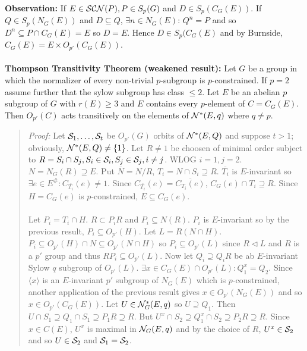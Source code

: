 {\bf Observation:}  If $E \in {\cal SCN}(P), P \in S_p(G)$ and $D \in S_p(C_G(E))$.  If
$Q \in S_p(N_G(E))$ and $D \subseteq Q$, $\exists n \in N_G(E)$: $Q^n=P$ and so
$D^n \subseteq P \cap C_G(E) = E$ so $D=E$.  Hence $D \in S_p(C_G(E)$ and by Burnside,
$C_G(E)= E \times O_{p'}(C_G(E))$.
\\
\\
{\bf Thompson Transitivity Theorem (weakened result):}  Let $G$ be a group in which the
normalizer of every non-trivial $p$-subgroup is $p$-constrained.  If $p=2$ assume further
that the sylow subgroup has class $\le 2$.  Let $E$ be an abelian $p$ subgroup of $G$ with
$r(E) \ge 3$ and $E$ contains every $p$-element of $C= C_G(E)$.  Then
$O_{p'}(C)$ acts transitively on the elements of ${\cal N}^*(E, q)$ where $q \ne p$.
\begin{quote}
\emph{Proof:}  
Let $ {\cal S}_1, \ldots , {\cal S}_t$ be $O_{p'}(G)$ orbits of 
${\cal N}^*(E,Q)$ and suppose $t > 1$; obviously, ${\cal N}^*(E,Q) \ne \{ 1 \}$.
Let $R \ne 1$ be choosen of minimal order subject to  
$R= S_i \cap S_j, S_i \in {\cal S}_i, S_j \in {\cal S}_j, i \ne j$.  WLOG $i=1, j=2$.
$N= N_G(R) \supseteq E$.  Put ${\overline N}= N/R$, $T_i = N \cap S_i \supseteq R$.
${\overline {T_i}}$ is $E$-invariant so $\exists e \in E^{\#} : C_{\overline {T_i}}(e) \ne 1$.
Since
$ C_{\overline {T_i}}(e) = {\overline {C_{T_i}(e)}} $,  $C_G(e) \cap T_i \supseteq R$.
Since $H= C_G(e)$ is $p$-constrained, $E \subseteq C_G(e)$.
\\
\\
Let $P_i= T_i \cap H$.  $R \subset P_i R$ and $P_i \subseteq N(R)$.
$P_i$ is $E$-invariant so by the previous result, $P_i \subseteq O_{p'}(H)$.
Let $L= R(N \cap H)$.  $P_i \subseteq O_{p'}(H) \cap N \subseteq O_{p'}(N \cap H)$ so
$P_i \subseteq O_{p'}(L)$ since $R \lhd L$ and $R$ is a  $p'$ group and thus
$R P_i \subseteq O_{p'}(L)$.
Now let $Q_i \supseteq Q_i R$ be ab $E$-invariant Sylow $q$ subgroup of $O_{p'}(L)$.
$\exists x \in C_G(E) \cap O_{p'}(L): Q_1^x = Q_2$.  Since $ \langle x \rangle $ is an $E$-invariant
$p'$ subgroup of $N_G(E)$ which is $p$-constrained, another application of the previous
result gives $x \in O_{p'}(N_G(E))$ and so $x \in O_{p'}(C_G(E))$.
Let $U \in {\cal N}_G^*(E,q)$ so $U \supseteq Q_1$.  Then 
$U \cap S_1 \supseteq Q_1 \cap S_1 \supseteq P_1R \supseteq R$.  But
$U^x \cap S_2 \supseteq Q_1^x \cap S_2 \supseteq P_2R \supseteq R$.
Since $x \in C(E)$, $U^x$ is maximal in ${\cal N}_G(E,q)$ and by the choice of $R$,
$U^x \in {\cal S}_2$ and so
$U \in {\cal S}_2$ and ${\cal S}_1 = {\cal S}_2$.
\end{quote}
